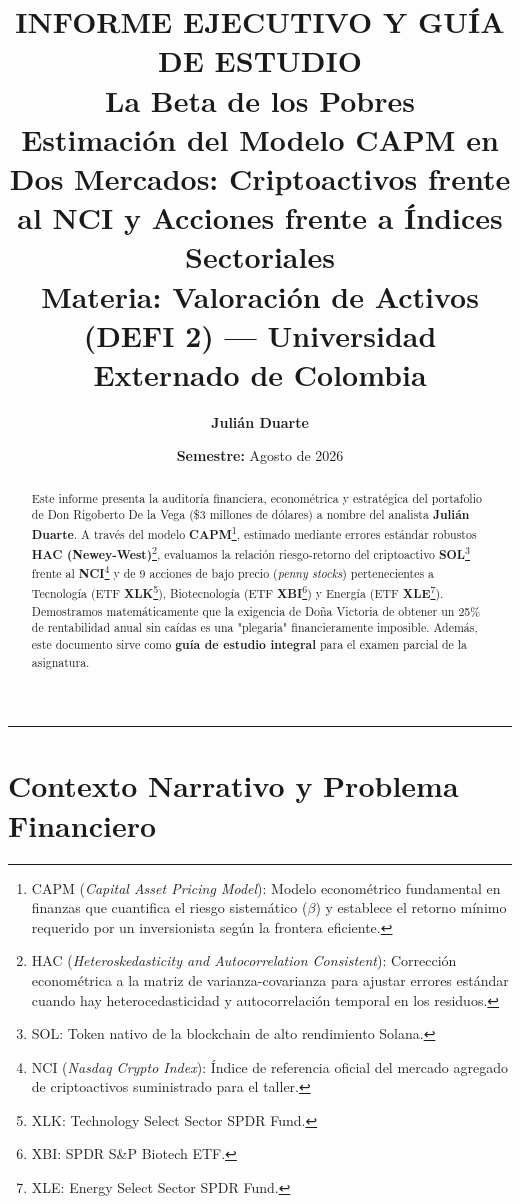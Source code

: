 \documentclass[11pt,a4paper]{article}
\title{
    \vspace{-1.5cm}
    \textbf{\Large INFORME EJECUTIVO Y GUÍA DE ESTUDIO}\\
    \textbf{\huge La Beta de los Pobres}\\
    \Large Estimación del Modelo CAPM en Dos Mercados: Criptoactivos frente al NCI y Acciones frente a Índices Sectoriales\\
    \vspace{0.3cm}
    \small\textbf{Materia:} Valoración de Activos (DEFI 2) --- Universidad Externado de Colombia
}
\author{\textbf{Julián Duarte}}
\date{\textbf{Semestre:} Agosto de 2026}
\begin{document}
\maketitle

\begin{abstract}
\noindent Este informe presenta la auditoría financiera, econométrica y estratégica del portafolio de Don Rigoberto De la Vega (\$3 millones de dólares) a nombre del analista \textbf{Julián Duarte}. A través del modelo \textbf{CAPM}\footnote{CAPM (\textit{Capital Asset Pricing Model}): Modelo econométrico fundamental en finanzas que cuantifica el riesgo sistemático ($\beta$) y establece el retorno mínimo requerido por un inversionista según la frontera eficiente.}, estimado mediante errores estándar robustos \textbf{HAC (Newey-West)}\footnote{HAC (\textit{Heteroskedasticity and Autocorrelation Consistent}): Corrección econométrica a la matriz de varianza-covarianza para ajustar errores estándar cuando hay heterocedasticidad y autocorrelación temporal en los residuos.}, evaluamos la relación riesgo-retorno del criptoactivo \textbf{SOL}\footnote{SOL: Token nativo de la blockchain de alto rendimiento Solana.} frente al \textbf{NCI}\footnote{NCI (\textit{Nasdaq Crypto Index}): Índice de referencia oficial del mercado agregado de criptoactivos suministrado para el taller.} y de 9 acciones de bajo precio (\textit{penny stocks}) pertenecientes a Tecnología (ETF \textbf{XLK}\footnote{XLK: Technology Select Sector SPDR Fund.}), Biotecnología (ETF \textbf{XBI}\footnote{XBI: SPDR S\&P Biotech ETF.}) y Energía (ETF \textbf{XLE}\footnote{XLE: Energy Select Sector SPDR Fund.}). Demostramos matemáticamente que la exigencia de Doña Victoria de obtener un 25\% de rentabilidad anual sin caídas es una "plegaria" financieramente imposible. Además, este documento sirve como \textbf{guía de estudio integral} para el examen parcial de la asignatura.
\end{abstract}

\vspace{0.2cm}\hrule\vspace{0.2cm}

\section{Contexto Narrativo y Problema Financiero}
\end{document}
